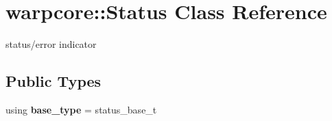\hypertarget{classwarpcore_1_1Status}{}\section{warpcore\+:\+:Status Class Reference}
\label{classwarpcore_1_1Status}


status/error indicator  


\subsection*{Public Types}
\begin{DoxyCompactItemize}
\item 
\mbox{\label{classwarpcore_1_1Status_a0e21e06e5f80160f71c4dfc7a1477ec9}} 
using {\bfseries base\+\_\+type} = status\+\_\+base\+\_\+t
\end{DoxyCompactItemize}
